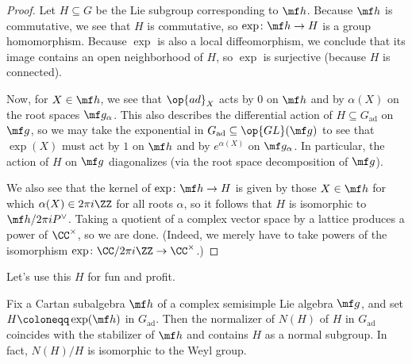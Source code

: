 \documentclass[../notes.tex]{subfiles}
\begin{document}
\begin{proof}
	Let $H\subseteq G$ be the Lie subgroup corresponding to $\mf h$. Because $\mf h$ is commutative, we see that $H$ is commutative, so $\exp\colon\mf h\to H$ is a group homomorphism. Because $\exp$ is also a local diffeomorphism, we conclude that its image contains an open neighborhood of $H$, so $\exp$ is surjective (because $H$ is connected).

	Now, for $X\in\mf h$, we see that $\op{ad}_X$ acts by $0$ on $\mf h$ and by $\alpha(X)$ on the root spaces $\mf g_\alpha$. This also describes the differential action of $H\subseteq G_{\mathrm{ad}}$ on $\mf g$, so we may take the exponential in $G_{\mathrm{ad}}\subseteq\op{GL}(\mf g)$ to see that $\exp(X)$ must act by $1$ on $\mf h$ and by $e^{\alpha(X)}$ on $\mf g_\alpha$. In particular, the action of $H$ on $\mf g$ diagonalizes (via the root space decomposition of $\mf g$).
	
	We also see that the kernel of $\exp\colon\mf h\to H$ is given by those $X\in\mf h$ for which $\alpha(X)\in2\pi i\ZZ$ for all roots $\alpha$, so it follows that $H$ is isomorphic to $\mf h/2\pi iP^\lor$. Taking a quotient of a complex vector space by a lattice produces a power of $\CC^\times$, so we are done. (Indeed, we merely have to take powers of the isomorphism $\exp\colon\CC/2\pi i\ZZ\to\CC^\times$.)
\end{proof}
Let's use this $H$ for fun and profit.
\begin{proposition} \label{prop:compute-weyl-group}
	Fix a Cartan subalgebra $\mf h$ of a complex semisimple Lie algebra $\mf g$, and set $H\coloneqq\exp(\mf h)$ in $G_{\mathrm{ad}}$. Then the normalizer of $N(H)$ of $H$ in $G_{\mathrm{ad}}$ coincides with the stabilizer of $\mf h$ and contains $H$ as a normal subgroup. In fact, $N(H)/H$ is isomorphic to the Weyl group.
\end{proposition}
\end{document}
